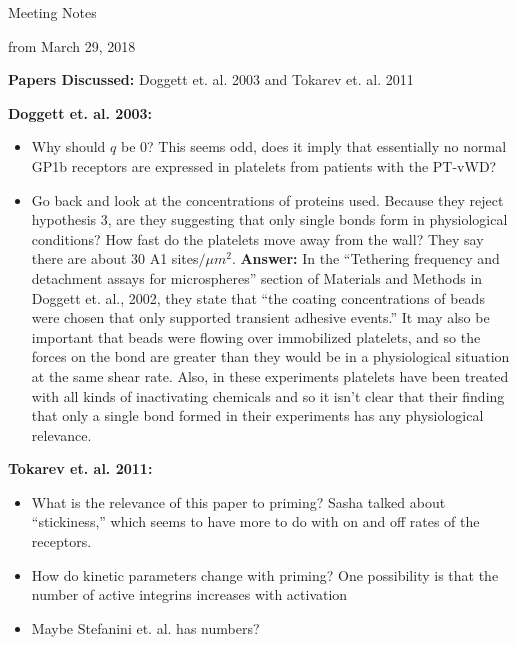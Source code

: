 \documentclass{article}
\begin{document}
\pagestyle{empty}


\begin{center}
{\Large Meeting Notes}

from March 29, 2018
\end{center}

\textbf{Papers Discussed:} Doggett et. al. 2003
and Tokarev et. al. 2011

\textbf{Doggett et. al. 2003:}
\begin{itemize}
\item Why should $q$ be 0? This seems odd, does it imply that
  essentially no normal GP1b receptors are expressed in platelets from
  patients with the PT-vWD? 
\item Go back and look at the concentrations of proteins used. Because
  they reject hypothesis 3, are they suggesting that only single bonds
  form in physiological conditions? How fast do the platelets move away from
  the wall? They say there are about 30 A1 sites$/\mu
  m^2$. \textbf{Answer:} In the ``Tethering frequency and detachment
  assays for microspheres'' section of Materials and Methods in
  Doggett et. al., 2002, they state that ``the coating concentrations
  of beads were chosen that only supported transient adhesive
  events.'' It may also be important that beads were flowing over
  immobilized platelets, and so the forces on the bond are greater
  than they would be in a physiological situation at the same shear
  rate. Also, in these experiments platelets have been treated with
  all kinds of inactivating chemicals and so it isn't clear that their
  finding that only a single bond formed in their experiments has any
  physiological relevance.
\end{itemize}

\textbf{Tokarev et. al. 2011:}
\begin{itemize}
\item What is the relevance of this paper to priming? Sasha talked
  about ``stickiness,'' which seems to have more to do with on and off
  rates of the receptors. 
\item How do kinetic parameters change with priming? One possibility
  is that the number of active integrins increases with activation
\item Maybe Stefanini et. al. has numbers?
\end{itemize}
\end{document}
